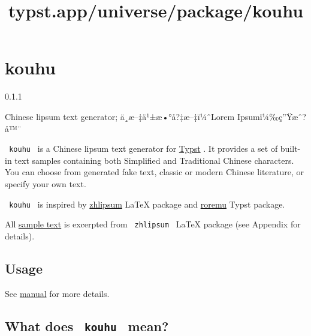 \title{typst.app/universe/package/kouhu}

\label{banner}
\section{kouhu}\label{kouhu}

{ 0.1.1 }

Chinese lipsum text generator; ä¸­æ--‡ä¹±æ•°å?‡æ--‡ï¼ˆLorem
Ipsumï¼‰ç''Ÿæˆ?å™¨

\label{readme}
\texttt{\ kouhu\ } is a Chinese lipsum text generator for
\href{https://typst.app/}{Typst} . It provides a set of built-in text
samples containing both Simplified and Traditional Chinese characters.
You can choose from generated fake text, classic or modern Chinese
literature, or specify your own text.

\texttt{\ kouhu\ } is inspired by
\href{https://ctan.org/pkg/zhlipsum}{zhlipsum} LaTeX package and
\href{https://typst.app/universe/package/roremu}{roremu} Typst package.

All
\href{https://github.com/typst/packages/raw/main/packages/preview/kouhu/0.1.1/data/zhlipsum.json}{sample
text} is excerpted from \texttt{\ zhlipsum\ } LaTeX package (see
Appendix for details).

\subsection{Usage}\label{usage}

\begin{Shaded}
\begin{Highlighting}[]



\end{Highlighting}
\end{Shaded}

See
\href{https://github.com/Harry-Chen/kouhu/blob/master/doc/manual.pdf}{manual}
for more details.

\subsection{\texorpdfstring{What does \texttt{\ kouhu\ }
mean?}{What does  kouhu  mean?}}\label{what-does-kouhu-mean}


